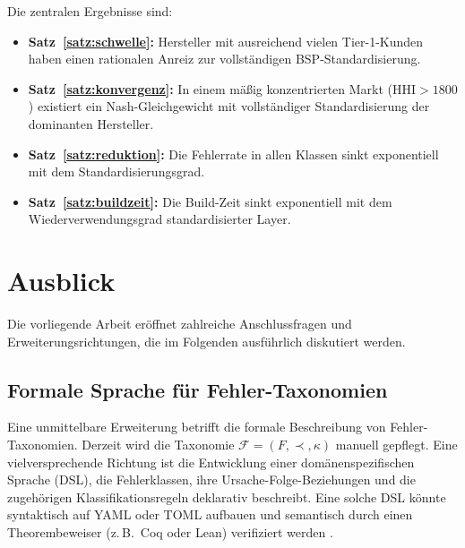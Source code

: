 ﻿\documentclass[a4paper,12pt]{article}
\theoremstyle{definition}
\begin{document}
Die zentralen Ergebnisse sind:
\begin{itemize}
	\item \textbf{Satz~\ref{satz:schwelle}:} Hersteller mit ausreichend vielen
	      Tier-1-Kunden haben einen rationalen Anreiz zur vollständigen BSP-Standardisierung.
	\item \textbf{Satz~\ref{satz:konvergenz}:} In einem mäßig konzentrierten Markt
	      ($\mathrm{HHI} > 1800$) existiert ein Nash-Gleichgewicht mit vollständiger
	      Standardisierung der dominanten Hersteller.
	\item \textbf{Satz~\ref{satz:reduktion}:} Die Fehlerrate in allen Klassen sinkt
	      exponentiell mit dem Standardisierungsgrad.
	\item \textbf{Satz~\ref{satz:buildzeit}:} Die Build-Zeit sinkt exponentiell mit
	      dem Wiederverwendungsgrad standardisierter Layer.
\end{itemize}

\section{Ausblick}

Die vorliegende Arbeit eröffnet zahlreiche Anschlussfragen und Erweiterungsrichtungen,
die im Folgenden ausführlich diskutiert werden.

\subsection{Formale Sprache für Fehler-Taxonomien}

Eine unmittelbare Erweiterung betrifft die formale Beschreibung von Fehler-Taxonomien.
Derzeit wird die Taxonomie $\mathcal{F} = (F, \prec, \kappa)$ manuell gepflegt.
Eine vielversprechende Richtung ist die Entwicklung einer domänenspezifischen Sprache
(DSL), die Fehlerklassen, ihre Ursache-Folge-Beziehungen und die zugehörigen
Klassifikationsregeln deklarativ beschreibt. Eine solche DSL könnte syntaktisch
auf YAML oder TOML aufbauen und semantisch durch einen Theorembeweiser (z.\,B.\ Coq oder Lean)
verifiziert werden \cite{coq2024}.
\end{document}
